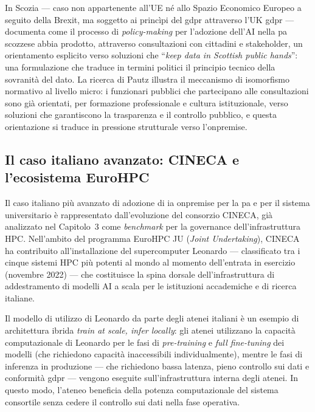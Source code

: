 In Scozia --- caso non appartenente all'UE né allo Spazio Economico Europeo
a seguito della Brexit, ma soggetto ai princìpi del \gls{gdpr} attraverso l'UK \gls{gdpr} ---
\textcite{Pautz2023} documenta come il processo di \textit{policy-making} per
l'adozione dell'AI nella \gls{pa} scozzese abbia prodotto, attraverso consultazioni
con cittadini e stakeholder, un orientamento esplicito verso soluzioni che
``\textit{keep data in Scottish public hands}'': una formulazione che traduce in
termini politici il principio tecnico della sovranità del dato. La ricerca di
Pautz illustra il meccanismo di isomorfismo normativo al livello micro: i
funzionari pubblici che partecipano alle consultazioni sono già orientati, per
formazione professionale e cultura istituzionale, verso soluzioni che garantiscono
la trasparenza e il controllo pubblico, e questa orientazione si traduce in
pressione strutturale verso l'\gls{onpremise}.

\subsection{Il caso italiano avanzato: CINECA e l'ecosistema EuroHPC}

Il caso italiano più avanzato di adozione di \gls{ia} \gls{onpremise} per la \gls{pa}
e per il sistema universitario è rappresentato dall'evoluzione del consorzio
CINECA, già analizzato nel Capitolo~3 come \textit{benchmark} per la
governance dell'infrastruttura HPC. Nell'ambito del programma EuroHPC JU
(\textit{Joint Undertaking}), CINECA ha contribuito all'installazione del
supercomputer Leonardo \parencite{EuroHPC_Leonardo} --- classificato tra
i cinque sistemi HPC più potenti al mondo al momento dell'entrata in esercizio
(novembre 2022) --- che costituisce la spina dorsale dell'infrastruttura di
addestramento di modelli AI a scala per le istituzioni accademiche e di ricerca
italiane.

Il modello di utilizzo di Leonardo da parte degli atenei italiani è un esempio
di architettura ibrida \textit{train at scale, infer locally}: gli atenei
utilizzano la capacità computazionale di Leonardo per le fasi di
\textit{pre-training} e \textit{full fine-tuning} dei modelli (che richiedono
capacità inaccessibili individualmente), mentre le fasi di inferenza in produzione
--- che richiedono bassa latenza, pieno controllo sui dati e conformità \gls{gdpr} ---
vengono eseguite sull'infrastruttura interna degli atenei. In questo modo, l'ateneo
beneficia della potenza computazionale del sistema consortile senza cedere il
controllo sui dati nella fase operativa.

